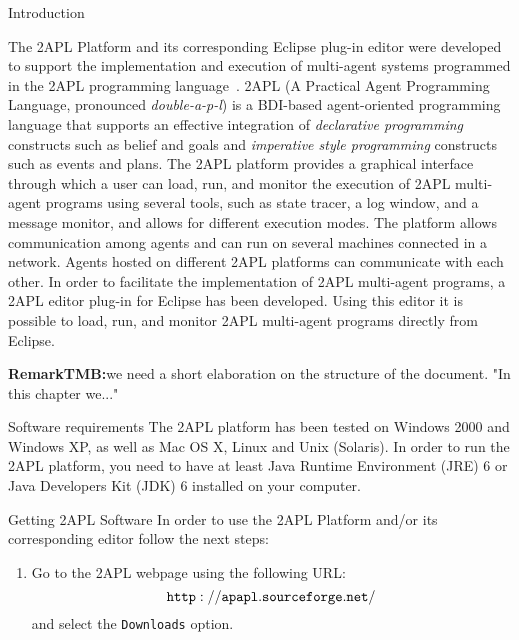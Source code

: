 \newcommand{\remarktmb}[1]{\textbf{RemarkTMB:}#1}

\begin{chapter}{Introduction}
\label{chap:introduction}

The 2APL Platform and its corresponding Eclipse plug-in editor were
developed to support the implementation and execution of multi-agent
systems programmed in the 2APL programming
language~\cite{Dastani:08a,D-RULECHP09,CLIMA09}. 2APL (A Practical
Agent Programming Language, pronounced \emph{double-a-p-l}) is a BDI-based
agent-oriented programming language that supports an effective
integration of \emph{declarative programming} constructs such as belief and
goals and \emph{imperative style programming} constructs such as events and
plans. The 2APL platform provides a graphical interface through
which a user can load, run, and monitor the execution of 2APL
multi-agent programs using several tools, such as state tracer, 
a log window, and a message monitor, and allows for different execution modes. 
The platform allows communication among agents and can run
on several machines connected in a network. Agents hosted on
different 2APL platforms can communicate with each other. In order
to facilitate the implementation of 2APL multi-agent programs, a
2APL editor plug-in for Eclipse has been developed. Using this editor it
is possible to load, run, and monitor 2APL multi-agent programs
directly from Eclipse.

\remarktmb{we need a short elaboration on the structure of the document. "In this chapter we..."}

\begin{section}{Software requirements}
The 2APL platform has been tested on Windows 2000 and Windows XP, as
well as Mac OS X, Linux and Unix (Solaris). In order to run the 2APL
platform, you need to have at least Java Runtime Environment (JRE) 6
or Java Developers Kit (JDK) 6 installed on your computer.
\end{section}

\begin{section}{Getting 2APL Software}
In order to use the 2APL Platform and/or its corresponding editor
follow the next steps:
\begin{enumerate}
    \item Go to the 2APL webpage using the following URL:
          $${\tt http://apapl.sourceforge.net/}$$
          and select the {\tt Downloads} option.


\end{enumerate}
\end{section}
\end{chapter}
